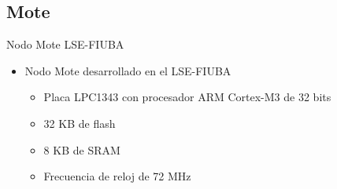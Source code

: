 \documentclass[aspectratio=169]{beamer}
\begin{document}
\subsection[Mote]{Mote}
\begin{frame}{Nodo Mote LSE-FIUBA} 

\begin{minipage}[c]{1.0\linewidth}
	\begin{minipage}[c]{0.6\linewidth}
		\begin{itemize}
			\item Nodo Mote desarrollado en el LSE-FIUBA
			\begin{itemize}
				\item Placa LPC1343 con procesador ARM Cortex-M3 de 32 bits
				\item 32 KB de flash
				\item 8 KB de SRAM
				\item Frecuencia de reloj de 72 MHz
			\end{itemize}
			\vspace{10px}
		\end{itemize}
	\end{minipage}
	\begin{minipage}[c]{0.35\linewidth}
		\begin{figure}[H]
			\label{Mote LSE}
		\end{figure}	  	  	
	\end{minipage}
\end{minipage}
\end{frame}

\end{document}
